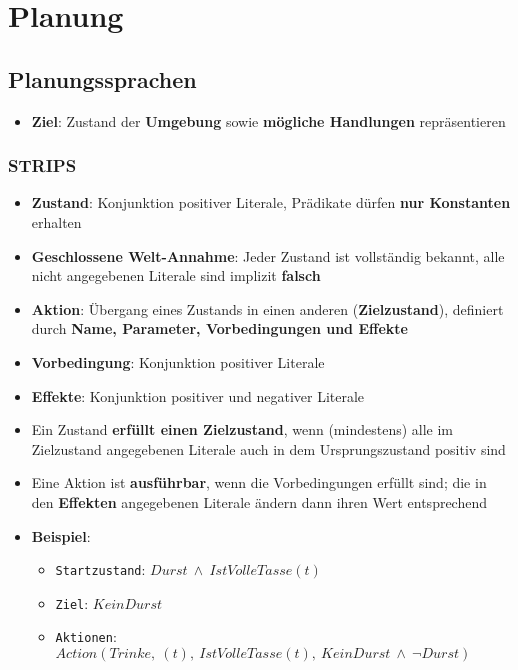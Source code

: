 \section{Planung}%
\label{plan:sec:planung}

\subsection{Planungssprachen}%
\label{plan:sub:planungssprachen}

\begin{itemize}
	\item \textbf{Ziel}: Zustand der \textbf{Umgebung} sowie \textbf{mögliche Handlungen} repräsentieren
\end{itemize}

\subsubsection{STRIPS}%
\label{plan:ssub:strips}

\begin{itemize}
	\item \textbf{Zustand}: Konjunktion positiver Literale, Prädikate dürfen \textbf{nur Konstanten} erhalten
	\item \textbf{Geschlossene Welt-Annahme}: Jeder Zustand ist vollständig bekannt, alle nicht angegebenen Literale sind implizit \textbf{falsch}
	\item \textbf{Aktion}: Übergang eines Zustands in einen anderen (\textbf{Zielzustand}), definiert durch \textbf{Name, Parameter, Vorbedingungen und Effekte}
	\item \textbf{Vorbedingung}: Konjunktion positiver Literale
	\item \textbf{Effekte}: Konjunktion positiver und negativer Literale
	\item Ein Zustand \textbf{erfüllt einen Zielzustand}, wenn (mindestens) alle im Zielzustand angegebenen Literale auch in dem Ursprungszustand positiv sind
	\item Eine Aktion ist \textbf{ausführbar}, wenn die Vorbedingungen erfüllt sind; die in den \textbf{Effekten} angegebenen Literale ändern dann ihren Wert entsprechend
	\item \textbf{Beispiel}:
	\begin{itemize}
		\item \texttt{Startzustand}: $Durst\ \land\ IstVolleTasse(t)$
		\item \texttt{Ziel}: $KeinDurst$
		\item \texttt{Aktionen}: $Action(Trinke,\ (t),\ IstVolleTasse(t),\ KeinDurst\ \land\ \neg Durst)$
	\end{itemize}
\end{itemize}

